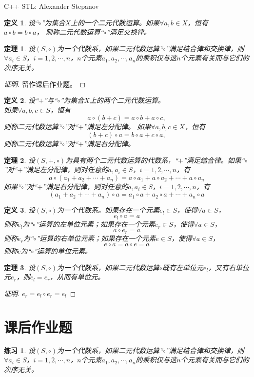 \documentclass{article}
\newtheorem{Def}{定义}
\newtheorem{Thm}{定理}
\newtheorem{Exercise}{练习}
\begin{document}
\begin{CJK*}{UTF8}{gbsn}
C++ STL: Alexander Stepanov
 \begin{Def}
    设“$\circ$”为集合$X$上的一个二元代数运算。如果$\forall a, b \in X$，恒有\\$a \circ b = b \circ a$， 则称二元代数运算“$\circ$”满足交换律。
  \end{Def}
  \begin{Thm}
    设$(S,\circ)$为一个代数系，如果二元代数运算“$\circ$”满足结合律和交换律，则$\forall a_i\in S$，$i=1,2,\cdots,n$，$n$个元素$a_1,a_2,\cdots,a_n$的乘积仅与这$n$个元素有关而与它们的次序无关。
  \end{Thm}
  \begin{proof}[证明]
留作课后作业题。    
  \end{proof}
  \begin{Def}
    设“$+$”与“$\circ$”为集合$X$上的两个二元代数运算。\\如果$\forall a, b, c \in S$，恒有\[a \circ (b + c) = a \circ b + a \circ c,\] 则称二元代数运算“$\circ$”对“$+$”满足左分配律。
    如果$\forall a, b, c \in X$，恒有\[(b + c)\circ a = b \circ a + c \circ a,\] 则称二元代数运算“$\circ$”对“$+$”满足右分配律。
  \end{Def}
  \begin{Thm}
    设$(S,+,\circ)$为具有两个二元代数运算的代数系，“$+$”满足结合律。如果“$\circ$”对“$+$”满足左分配律，则对任意的$a,a_i\in S$，$i=1,2,\cdots,n$，有
    \[a\circ (a_1+a_2+\cdots+a_n) = a\circ a_1 + a\circ a_2 + \cdots + a\circ a_n\]
    如果“$\circ$”对“$+$”满足右分配律，则对任意的$a,a_i\in S$，$i=1,2,\cdots,n$，有
    \[(a_1+a_2+\cdots+a_n)\circ a  = a_1\circ a + a_2\circ a + \cdots + a_n\circ a\]
  \end{Thm}
  \begin{Def}
    设$(S,\circ)$为一个代数系。如果存在一个元素$e_l\in S$，使得$\forall a\in S$，
    \[e_l\circ a = a\]
    则称$e_l$为“$\circ$”运算的左单位元素；如果存在一个元素$e_r\in S$，使得$\forall a\in S$，
    \[a\circ e_r = a\]
    则称$e_r$为“$\circ$”运算的右单位元素；如果存在一个元素$e\in S$，使得$\forall a\in S$，
    \[e\circ a = a\circ e = a\]
    则称$e$为“$\circ$”运算的单位元素。
  \end{Def}
  \begin{Thm}
    设$(S,\circ)$为一个代数系，如果二元代数运算$\circ$既有左单位元$e_l$，又有右单位元$e_r$，则$e_l=e_r$，从而有单位元。
  \end{Thm}
  \begin{proof}[证明]
    $e_r = e_l\circ e_r = e_l$
  \end{proof}
  \section{课后作业题}
  \begin{Exercise}
    设$(S,\circ)$为一个代数系，如果二元代数运算“$\circ$”满足结合律和交换律，则$\forall a_i\in S$，$i=1,2,\cdots,n$，$n$个元素$a_1,a_2,\cdots,a_n$的乘积仅与这$n$个元素有关而与它们的次序无关。
  \end{Exercise}


\end{CJK*}
\end{document}
